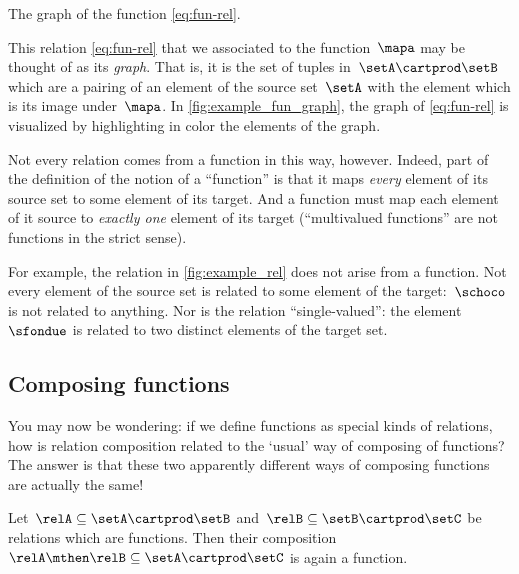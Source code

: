 \begin{marginfigure}
    \centering
    \caption{The graph of the function \cref{eq:fun-rel}.}
    \label{fig:example_fun_graph}
\end{marginfigure}

This relation \cref{eq:fun-rel} that we associated to the function~$\mapa$ may be thought of as its \emph{graph}.
That is, it is the set of tuples in~$\setA \cartprod \setB$ which are a pairing of an element of the source set~$\setA$ with the element which is its image under~$\mapa$.
In \cref{fig:example_fun_graph}, the graph of \cref{eq:fun-rel} is visualized by highlighting in color the elements of the graph.

Not every relation comes from a function in this way, however.
Indeed, part of the definition of the notion of a ``function'' is that it maps \emph{every} element of its source set to some element of its target.
And a function must map each element of it source to \emph{exactly one} element of its target (``multivalued functions'' are not functions in the strict sense).

For example, the relation in \cref{fig:example_rel} does not arise from a function.
Not every element of the source set is related to some element of the target:~$\schoco$ is not related to anything.
Nor is the relation ``single-valued'': the element~$\sfondue$ is related to two distinct elements of the target set.

\subsection{Composing functions}

You may now be wondering: if we define functions as special kinds of relations, how is relation composition related to the `usual' way of composing of functions?
The answer is that these two apparently different ways of composing functions are actually the same!

\begin{lemma}
    \label{lem:comprelfun}
    Let~$\relA \subseteq \setA \cartprod \setB$ and~$\relB \subseteq \setB \cartprod \setC$ be relations which are functions.
    Then their composition~$\relA \mthen \relB \subseteq \setA \cartprod \setC$ is again a function.
\end{lemma}

